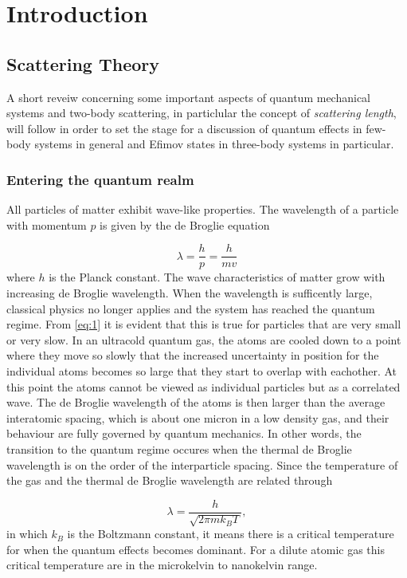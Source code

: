 \documentclass{article}
\numberwithin{equation}{section}
\begin{document}
\section{Introduction} 
\subsection{Scattering Theory}
A short reveiw concerning some important aspects of quantum mechanical systems and two-body scattering, in particlular the concept of \emph{scattering length}, will follow in order to set the stage for a discussion of quantum effects in few-body systems in general and Efimov states in three-body systems in particular. 

\subsubsection{Entering the quantum realm}
All particles of matter exhibit wave-like properties. The wavelength of a particle with momentum $p$ is given by the de Broglie equation

\begin{equation} \label{eq:1}
\lambda = \frac{h}{p} = \frac{h}{mv}
\end{equation}
where $h$ is the Planck constant. The wave characteristics of matter grow with increasing de Broglie wavelength. When the wavelength is sufficently large, classical physics no longer applies and the system has reached the quantum regime. From \ref{eq:1} it is evident that this is true for particles that are very small or very slow. In an ultracold quantum gas, the atoms are cooled down to a point where they move so slowly that the increased uncertainty in position for the individual atoms becomes so large that they start to overlap with eachother. At this point the atoms cannot be viewed as individual particles but as a correlated wave. The de Broglie wavelength of the atoms is then larger than the average interatomic spacing, which is about one micron in a low density gas, and their behaviour are fully governed by quantum mechanics. In other words, the transition to the quantum regime occures when the thermal de Broglie wavelength is on the order of the interparticle spacing. Since the temperature of the gas and the thermal de Broglie wavelength are related through

\begin{equation}
\lambda = \frac{h}{\sqrt{2\pi m k_B T}},
\end{equation}
in which $k_B$ is the Boltzmann constant, it means there is a critical temperature for when the quantum effects becomes dominant. For a dilute atomic gas this critical temperature are in the microkelvin to nanokelvin range.
 
\end{document}
